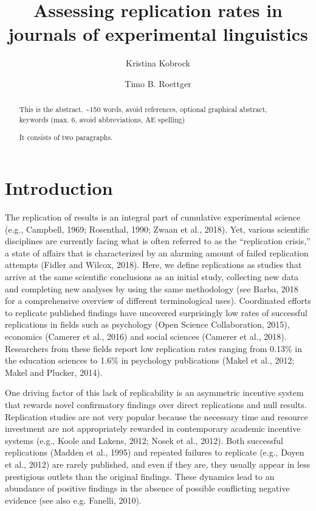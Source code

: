 \documentclass[]{elsarticle} %
\begin{document}
\begin{frontmatter}

  \title{Assessing replication rates in journals of experimental
linguistics}
    \author[University of Osnabrück]{Kristina Kobrock}
    \author[Universitetet i Oslo]{Timo B. Roettger}
  
      \address[University of Osnabrück]{Institute of Cognitive Science,
Wachsbleiche 27, 49090 Osnabrück}
    \address[Universitetet i Oslo]{Department of Linguistics and
Scandinavian Studies}
  
  \begin{abstract}
  This is the abstract. \textasciitilde150 words, avoid references,
  optional graphical abstract, keywords (max. 6, avoid abbreviations, AE
  spelling)

  It consists of two paragraphs.
  \end{abstract}
  
 \end{frontmatter}

\hypertarget{introduction}{%
\section{Introduction}\label{introduction}}

The replication of results is an integral part of cumulative
experimental science (e.g., Campbell, 1969; Rosenthal, 1990; Zwaan et
al., 2018). Yet, various scientific disciplines are currently facing
what is often referred to as the ``replication crisis,'' a state of
affairs that is characterized by an alarming amount of failed
replication attempts (Fidler and Wilcox, 2018). Here, we define
replications as studies that arrive at the same scientific conclusions
as an initial study, collecting new data and completing new analyses by
using the same methodology (see Barba, 2018 for a comprehensive overview
of different terminological uses). Coordinated efforts to replicate
published findings have uncovered surprisingly low rates of successful
replications in fields such as psychology (Open Science Collaboration,
2015), economics (Camerer et al., 2016) and social sciences (Camerer et
al., 2018). Researchers from these fields report low replication rates
ranging from 0.13\% in the education sciences to 1.6\% in psychology
publications (Makel et al., 2012; Makel and Plucker, 2014).

One driving factor of this lack of replicability is an asymmetric
incentive system that rewards novel confirmatory findings over direct
replications and null results. Replication studies are not very popular
because the necessary time and resource investment are not appropriately
rewarded in contemporary academic incentive systems (e.g., Koole and
Lakens, 2012; Nosek et al., 2012). Both successful replications (Madden
et al., 1995) and repeated failures to replicate (e.g., Doyen et al.,
2012) are rarely published, and even if they are, they usually appear in
less prestigious outlets than the original findings. These dynamics lead
to an abundance of positive findings in the absence of possible
conflicting negative evidence (see also e.g. Fanelli, 2010).
\end{document}
